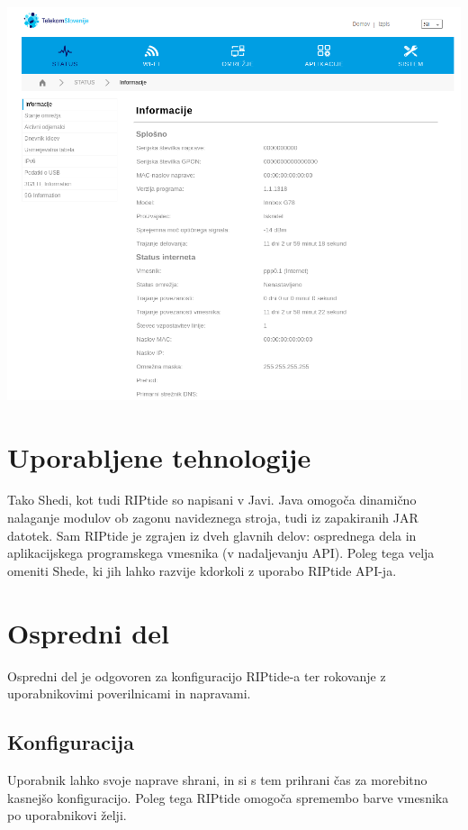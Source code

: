 \documentclass[12pt]{article}
\begin{document}
\begin{center}
	\includegraphics[scale=0.5]{slike/telekom.png}
\end{center}
\newpage

\section{Uporabljene tehnologije}
Tako Shedi, kot tudi RIPtide so napisani v Javi. Java omogoča dinamično
nalaganje modulov ob zagonu navideznega stroja, tudi iz zapakiranih JAR
datotek. Sam RIPtide je zgrajen iz dveh glavnih delov: osprednega dela 
in aplikacijskega programskega vmesnika (v nadaljevanju API).
Poleg tega velja omeniti Shede, ki jih lahko razvije kdorkoli z uporabo
RIPtide API-ja.
\newpage

\section{Ospredni del}
Ospredni del je odgovoren za konfiguracijo RIPtide-a ter rokovanje z 
uporabnikovimi poverilnicami in napravami.

\subsection{Konfiguracija}
Uporabnik lahko svoje naprave shrani, in si s tem prihrani čas za morebitno
kasnejšo konfiguracijo. Poleg tega RIPtide omogoča spremembo barve vmesnika
po uporabnikovi želji.
\end{document}
